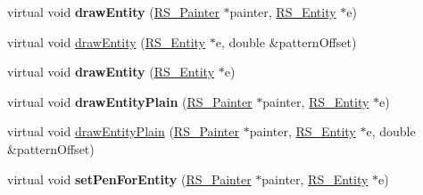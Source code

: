 \begin{DoxyCompactItemize}
\item 
\hypertarget{classRS__GraphicView_af990c780d472b88d8696f1b59b0674ca}{virtual void {\bfseries draw\-Entity} (\hyperlink{classRS__Painter}{R\-S\-\_\-\-Painter} $\ast$painter, \hyperlink{classRS__Entity}{R\-S\-\_\-\-Entity} $\ast$e)}\label{classRS__GraphicView_af990c780d472b88d8696f1b59b0674ca}

\item 
virtual void \hyperlink{classRS__GraphicView_a73fbdbd9a478ccf6266771555567d8e3}{draw\-Entity} (\hyperlink{classRS__Entity}{R\-S\-\_\-\-Entity} $\ast$e, double \&pattern\-Offset)
\item 
\hypertarget{classRS__GraphicView_a661cc72b65087c7698205a6e5e44b014}{virtual void {\bfseries draw\-Entity} (\hyperlink{classRS__Entity}{R\-S\-\_\-\-Entity} $\ast$e)}\label{classRS__GraphicView_a661cc72b65087c7698205a6e5e44b014}

\item 
\hypertarget{classRS__GraphicView_a39a547f51b644dff6c1add157b10059c}{virtual void {\bfseries draw\-Entity\-Plain} (\hyperlink{classRS__Painter}{R\-S\-\_\-\-Painter} $\ast$painter, \hyperlink{classRS__Entity}{R\-S\-\_\-\-Entity} $\ast$e)}\label{classRS__GraphicView_a39a547f51b644dff6c1add157b10059c}

\item 
virtual void \hyperlink{classRS__GraphicView_a679c51436dffa806e4ddc42feb160ff4}{draw\-Entity\-Plain} (\hyperlink{classRS__Painter}{R\-S\-\_\-\-Painter} $\ast$painter, \hyperlink{classRS__Entity}{R\-S\-\_\-\-Entity} $\ast$e, double \&pattern\-Offset)
\item 
\hypertarget{classRS__GraphicView_a79b9691535ae8069f09d009520280d06}{virtual void {\bfseries set\-Pen\-For\-Entity} (\hyperlink{classRS__Painter}{R\-S\-\_\-\-Painter} $\ast$painter, \hyperlink{classRS__Entity}{R\-S\-\_\-\-Entity} $\ast$e)}\label{classRS__GraphicView_a79b9691535ae8069f09d009520280d06}


\end{DoxyCompactItemize}

